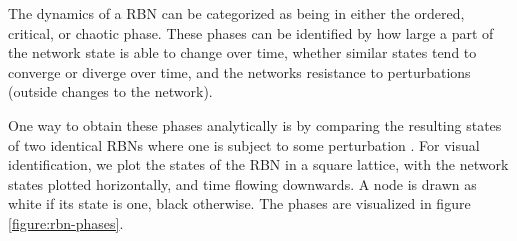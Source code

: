 The dynamics of a RBN can be categorized as being in either the ordered, critical, or chaotic phase.
These phases can be identified by how large a part of the network state is able to change over time,
whether similar states tend to converge or diverge over time,
and the networks resistance to perturbations (outside changes to the network).

One way to obtain these phases analytically is by comparing the resulting states of two identical RBNs where one is subject to some perturbation \cite{gershenson2004introduction}.
For visual identification, we plot the states of the RBN in a square lattice,
with the network states plotted horizontally, and time flowing downwards.
A node is drawn as white if its state is one, black otherwise.
The phases are visualized in figure \ref{figure:rbn-phases}.

